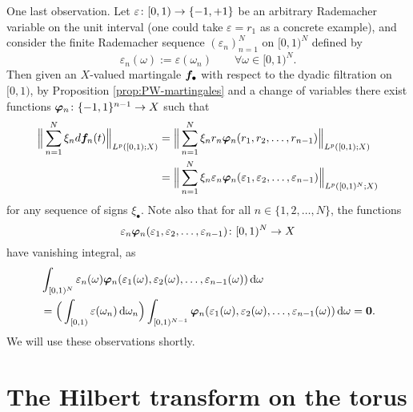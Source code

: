   One last observation.
  Let $\varepsilon \colon [0,1) \rightarrow \{-1,+1\}$ be an arbitrary Rademacher variable on the unit interval (one could take $\varepsilon = r_{1}$ as a concrete example), and consider the finite Rademacher sequence $(\varepsilon_{n})_{n = 1}^N$ on $[0,1)^{N}$ defined by
  \begin{equation*}
    \varepsilon_{n}(\omega) := \varepsilon(\omega_{n}) \qquad \forall \omega \in [0,1)^{N}.
  \end{equation*}
  Then given an $X$-valued martingale $\bm{f}_{\bullet}$ with respect to the dyadic filtration on $[0,1)$, by Proposition \ref{prop:PW-martingales} and a change of variables there exist functions $\bm{\varphi}_{n} \colon \{-1,1\}^{n-1} \to X$ such that
  \begin{equation*}
    \begin{aligned}
      \Big\| \sum_{n=1}^{N} \xi_{n}  d\bm{f}_{n}(t) \Big\|_{L^p([0,1);X)}
      &= \Big\| \sum_{n=1}^{N} \xi_{n} r_{n} \bm{\varphi}_{n}(r_{1}, r_{2}, \ldots, r_{n-1}) \Big\|_{L^p([0,1);X)} \\
      &= \Big\| \sum_{n=1}^{N} \xi_{n} \varepsilon_{n} \bm{\varphi}_{n}(\varepsilon_{1}, \varepsilon_{2}, \ldots, \varepsilon_{n-1}) \Big\|_{L^p([0,1)^{N};X)}
    \end{aligned}
  \end{equation*}
  for any sequence of signs $\xi_{\bullet}$.
  Note also that for all $n \in \{1,2,\ldots,N\}$, the functions
  \begin{equation*}
    \varepsilon_{n} \bm{\varphi}_{n}(\varepsilon_{1}, \varepsilon_{2}, \ldots, \varepsilon_{n-1}) \colon [0,1)^{N} \to X
  \end{equation*}
  have vanishing integral, as
  \begin{equation*}
    \begin{aligned}
      &\int_{[0,1)^{N}} \varepsilon_{n}(\omega) \bm{\varphi}_{n}(\varepsilon_{1}(\omega), \varepsilon_{2}(\omega), \ldots, \varepsilon_{n-1}(\omega)) \, \mathrm{d} \omega \\
    &= \Big( \int_{[0,1)} \varepsilon(\omega_{n}) \, \mathrm{d}\omega_{n} \Big) \int_{[0,1)^{N-1}} \bm{\varphi}_{n}(\varepsilon_{1}(\omega), \varepsilon_{2}(\omega), \ldots, \varepsilon_{n-1}(\omega)) \, \mathrm{d} \omega = \bm{0}.
  \end{aligned}
\end{equation*}
We will use these observations shortly.
  
  \section{The Hilbert transform on the torus}

